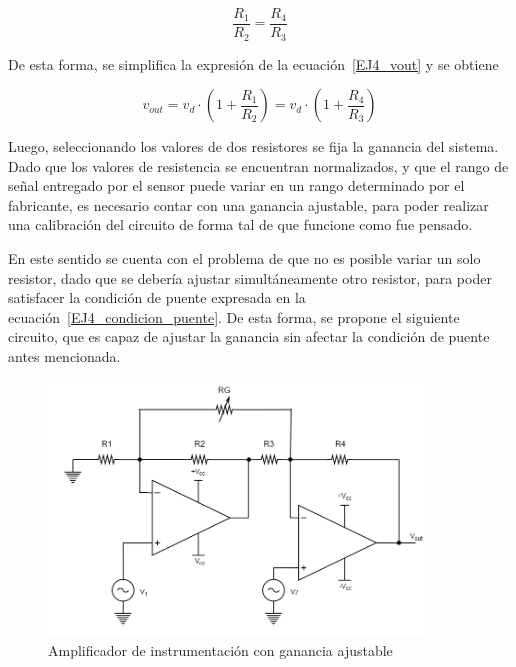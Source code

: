 \begin{equation}
\frac{R_1}{R_2} = \frac{R_4}{R_3} 
\label{EJ4_condicion_puente}
\end{equation}

De esta forma, se simplifica la expresi\'on de la ecuaci\'on~\ref{EJ4_vout} y se obtiene

\begin{equation}
v_{out} = v_d \cdot \left( 1+\frac{R_1}{R_2} \right) = v_d \cdot \left( 1+\frac{R_4}{R_3} \right)
\end{equation}

Luego, seleccionando los valores de dos resistores se fija la ganancia del sistema. Dado que los valores de resistencia se encuentran normalizados, y que el rango de se\~nal entregado por el sensor puede variar en un rango determinado por el fabricante, es necesario contar con una ganancia ajustable, para poder realizar una calibraci\'on del circuito de forma tal de que funcione como fue pensado.


En  este sentido se cuenta con el problema de que no es posible variar un solo resistor, dado que se deber\'ia ajustar simult\'aneamente otro resistor, para poder satisfacer la condici\'on de puente expresada en la ecuaci\'on~\ref{EJ4_condicion_puente}. De esta forma, se propone el siguiente circuito, que es capaz de ajustar la ganancia sin afectar la condici\'on de puente antes mencionada.


\begin{figure}[H]
    \centering
    \includegraphics[width=0.9\textwidth]{../EJ4/resources/instrumental_2opamp_adjgain.png}
	\caption{Amplificador de instrumentaci\'on con ganancia ajustable}
   	\label{fig:EJ4_2opamp_adjgain}
\end{figure}

